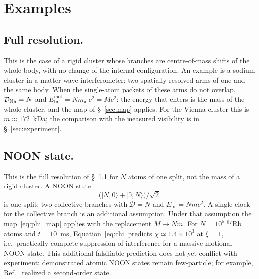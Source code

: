 \documentclass[11pt,a4paper]{article}
\begin{document}
\section{Examples}\label{sec:branch_examples}

\subsection{Full resolution.}
\label{sec:full_resolution}
This is the case of a rigid cluster whose branches are centre-of-mass shifts of the whole body, with no change of the internal configuration. An example is a sodium cluster in a matter-wave interferometer: two spatially resolved arms of one and the same body. When the single-atom packets of these arms do not overlap, $\mathcal D_{\rm Na}=N$ and $E_{\mathrm{br}}^{\mathrm{mot}}=Nm_{\mathrm{at}}c^2=Mc^2$: the energy that enters is the mass of the whole cluster, and the map of \S~\ref{sec:map} applies. For the Vienna cluster this is $m\approx172$~kDa; the comparison with the measured visibility is in \S~\ref{sec:experiment}.

\subsection{NOON state.}
This is the full resolution of \S~\ref{sec:full_resolution} for $N$ atoms of one split, not the mass of a rigid cluster. A NOON state
\begin{equation}
\bigl(|N,0\rangle+|0,N\rangle\bigr)/\sqrt2
\end{equation}
is one split: two collective branches with $\mathcal D=N$ and $E_{\mathrm{br}}=Nmc^2$. A single clock for the collective branch is an additional assumption. Under that assumption the map~\eqref{eq:phi_map} applies with the replacement $M\to Nm$. For $N=10^5$ ${}^{87}\mathrm{Rb}$ atoms and $t=10$~ms, Equation~\eqref{eq:chi} predicts $\chi\simeq1.4\times10^3$ at $\xi=1$, i.e.\ practically complete suppression of interference for a massive motional NOON state. This additional falsifiable prediction does not yet conflict with experiment: demonstrated atomic NOON states remain few-particle; for example, Ref.~\cite{chen2010noon} realized a second-order state.
\end{document}
